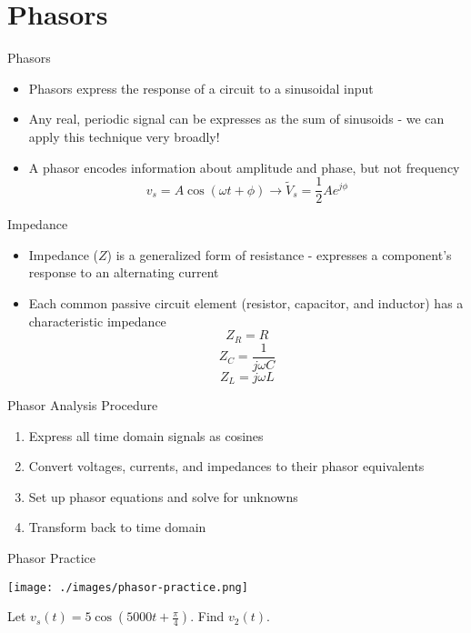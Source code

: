 
\section{Phasors}
	
    \begin{frame}{Phasors}
        \begin{itemize}
            \item Phasors express the response of a circuit to a sinusoidal input
            \item Any real, periodic signal can be expresses as the sum of sinusoids - we can apply this technique very broadly!
            \item A phasor encodes information about amplitude and phase, but not frequency
            $$v_s=A\cos(\omega t+\phi) \rightarrow \tilde{V}_s=\frac{1}{2} Ae^{j\phi}$$
        \end{itemize}
    \end{frame}
    
    \begin{frame}{Impedance}
        \begin{itemize}
            \item Impedance ($Z$) is a generalized form of resistance - expresses a component's response to an alternating current
            \item Each common passive circuit element (resistor, capacitor, and inductor) has a characteristic impedance
            $$Z_R=R$$
            $$Z_C=\frac{1}{j\omega C}$$
            $$Z_L=j\omega L$$
        \end{itemize}
    \end{frame}
    
    \begin{frame}{Phasor Analysis Procedure}
        \begin{enumerate}
            \item Express all time domain signals as cosines
            \item Convert voltages, currents, and impedances to their phasor equivalents
            \item Set up phasor equations and solve for unknowns
            \item Transform back to time domain
        \end{enumerate}
    \end{frame}
    
    \begin{frame}{Phasor Practice}
        \begin{center}
            \texttt{[image: ./images/phasor-practice.png]}
        \end{center}
        Let $v_s(t)=5\cos(5000t+\frac{\pi}{4})$. Find $v_2(t)$.
    \end{frame}

